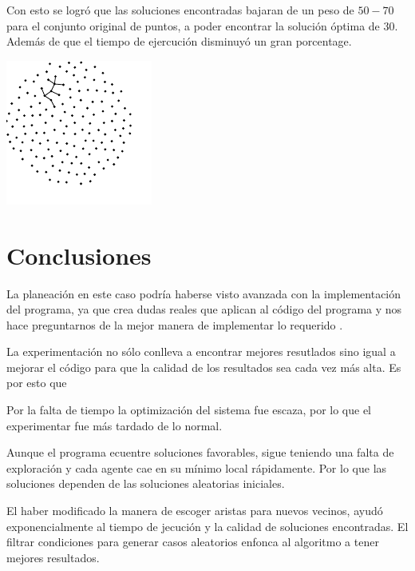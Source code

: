 \documentclass[a4paper]{report}
\begin{document}
Con esto se logr\'o que las soluciones encontradas bajaran de un peso de $50-70$ para el conjunto
original de puntos, a poder encontrar la soluci\'on \'optima de 30. Adem\'as de que el tiempo de ejercuci\'on disminuy\'o un gran porcentage.

\includegraphics[width=\textwidth]{alpha.pdf}



\section*{Conclusiones}
La planeaci\'on en este caso podr\'ia haberse visto avanzada con la implementaci\'on del programa,
ya que crea dudas reales que aplican al c\'odigo del programa y nos hace preguntarnos de la mejor
manera de implementar lo requerido .

La experimentaci\'on no s\'olo conlleva a encontrar mejores resutlados sino igual a mejorar el
c\'odigo para que la calidad de los resultados sea cada vez m\'as alta. Es por esto que

Por la falta de tiempo la optimización del sistema fue escaza, por lo que el experimentar fue m\'as
tardado de lo normal.

Aunque el programa ecuentre soluciones favorables, sigue teniendo una falta de exploraci\'on y cada agente cae en su m\'inimo local r\'apidamente. Por lo que las soluciones dependen de las soluciones aleatorias iniciales.

El haber modificado la manera de escoger aristas para nuevos vecinos, ayud\'o exponencialmente al tiempo de jecuci\'on y la calidad de soluciones encontradas. El filtrar condiciones para generar casos aleatorios enfonca al algoritmo a tener mejores resultados.

{}

\end{document}
